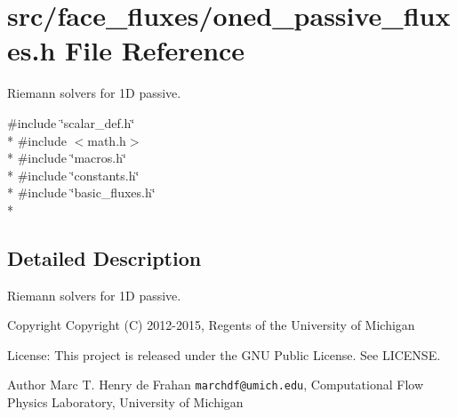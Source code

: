 \section{src/face\-\_\-fluxes/oned\-\_\-passive\-\_\-fluxes.h File Reference}
\label{oned__passive__fluxes_8h}


Riemann solvers for 1\-D passive.  


{\ttfamily \#include \char`\"{}scalar\-\_\-def.\-h\char`\"{}}\\*
{\ttfamily \#include $<$math.\-h$>$}\\*
{\ttfamily \#include \char`\"{}macros.\-h\char`\"{}}\\*
{\ttfamily \#include \char`\"{}constants.\-h\char`\"{}}\\*
{\ttfamily \#include \char`\"{}basic\-\_\-fluxes.\-h\char`\"{}}\\*


\subsection{Detailed Description}
Riemann solvers for 1\-D passive. \begin{DoxyCopyright}{Copyright}
Copyright (C) 2012-\/2015, Regents of the University of Michigan 
\end{DoxyCopyright}
\begin{DoxyParagraph}{License\-:}
This project is released under the G\-N\-U Public License. See L\-I\-C\-E\-N\-S\-E. 
\end{DoxyParagraph}
\begin{DoxyAuthor}{Author}
Marc T. Henry de Frahan {\tt marchdf@umich.\-edu}, Computational Flow Physics Laboratory, University of Michigan 
\end{DoxyAuthor}
